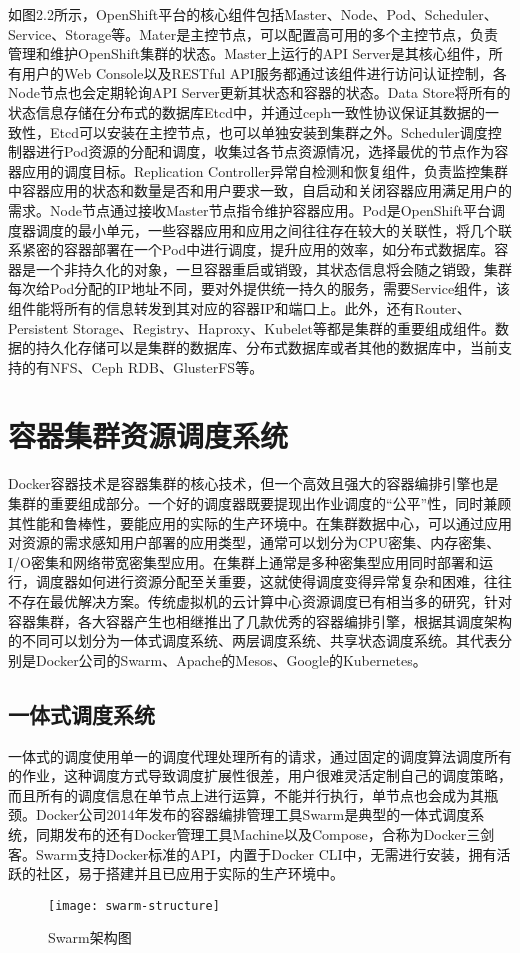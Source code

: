 如图2.2所示，OpenShift平台的核心组件包括Master、Node、Pod、Scheduler、Service、Storage等。Mater是主控节点，可以配置高可用的多个主控节点，负责管理和维护OpenShift集群的状态。Master上运行的API Server是其核心组件，所有用户的Web Console以及RESTful API服务都通过该组件进行访问认证控制，各Node节点也会定期轮询API Server更新其状态和容器的状态。Data Store将所有的状态信息存储在分布式的数据库Etcd中，并通过ceph一致性协议保证其数据的一致性，Etcd可以安装在主控节点，也可以单独安装到集群之外。Scheduler调度控制器进行Pod资源的分配和调度，收集过各节点资源情况，选择最优的节点作为容器应用的调度目标。Replication Controller异常自检测和恢复组件，负责监控集群中容器应用的状态和数量是否和用户要求一致，自启动和关闭容器应用满足用户的需求。Node节点通过接收Master节点指令维护容器应用。Pod是OpenShift平台调度器调度的最小单元，一些容器应用和应用之间往往存在较大的关联性，将几个联系紧密的容器部署在一个Pod中进行调度，提升应用的效率，如分布式数据库。容器是一个非持久化的对象，一旦容器重启或销毁，其状态信息将会随之销毁，集群每次给Pod分配的IP地址不同，要对外提供统一持久的服务，需要Service组件，该组件能将所有的信息转发到其对应的容器IP和端口上。此外，还有Router、Persistent Storage、Registry、Haproxy、Kubelet等都是集群的重要组成组件。数据的持久化存储可以是集群的数据库、分布式数据库或者其他的数据库中，当前支持的有NFS、Ceph RDB、GlusterFS等。

\section{容器集群资源调度系统}
\label{sec:scheduler}
Docker容器技术是容器集群的核心技术，但一个高效且强大的容器编排引擎也是集群的重要组成部分。一个好的调度器既要提现出作业调度的“公平”性，同时兼顾其性能和鲁棒性，要能应用的实际的生产环境中。在集群数据中心，可以通过应用对资源的需求感知用户部署的应用类型，通常可以划分为CPU密集、内存密集、I/O密集和网络带宽密集型应用。在集群上通常是多种密集型应用同时部署和运行，调度器如何进行资源分配至关重要，这就使得调度变得异常复杂和困难，往往不存在最优解决方案。传统虚拟机的云计算中心资源调度已有相当多的研究，针对容器集群，各大容器产生也相继推出了几款优秀的容器编排引擎，根据其调度架构的不同可以划分为一体式调度系统、两层调度系统、共享状态调度系统。其代表分别是Docker公司的Swarm、Apache的Mesos、Google的Kubernetes。

\subsection{一体式调度系统}
一体式的调度使用单一的调度代理处理所有的请求，通过固定的调度算法调度所有的作业，这种调度方式导致调度扩展性很差，用户很难灵活定制自己的调度策略，而且所有的调度信息在单节点上进行运算，不能并行执行，单节点也会成为其瓶颈。Docker公司2014年发布的容器编排管理工具Swarm是典型的一体式调度系统，同期发布的还有Docker管理工具Machine以及Compose，合称为Docker三剑客。Swarm支持Docker标准的API，内置于Docker CLI中，无需进行安装，拥有活跃的社区，易于搭建并且已应用于实际的生产环境中。
\begin{figure}[H] %
	\centering
	\texttt{[image: swarm-structure]}
	\caption{Swarm架构图}
	\label{fig:xfig1}
\end{figure}

